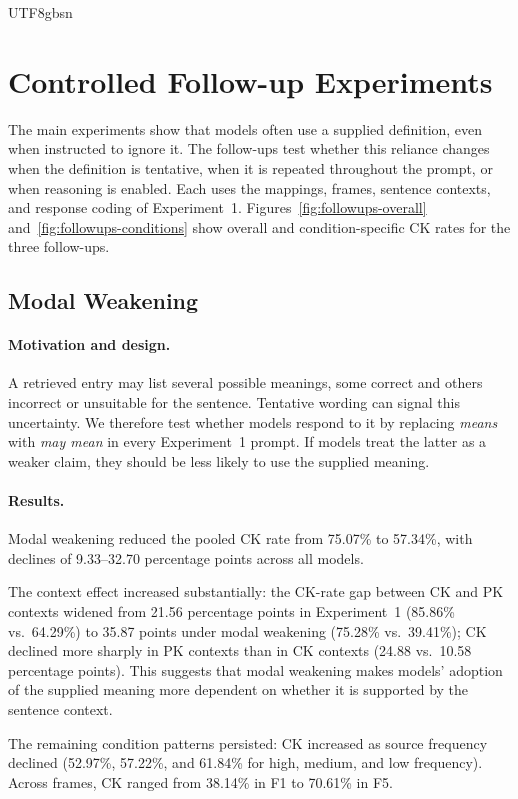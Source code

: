 \documentclass[11pt]{article}
\begin{document}
\begin{CJK*}{UTF8}{gbsn}
\section{Controlled Follow-up Experiments}
\label{sec:followups}

The main experiments show that models often use a supplied definition, even when instructed to ignore it. The follow-ups test whether this reliance changes when the definition is tentative, when it is repeated throughout the prompt, or when reasoning is enabled. Each uses the mappings, frames, sentence contexts, and response coding of Experiment~1. Figures~\ref{fig:followups-overall} and~\ref{fig:followups-conditions} show overall and condition-specific CK rates for the three follow-ups.

\subsection{Modal Weakening}
\label{sec:modal-weakening}

\paragraph{Motivation and design.}
A retrieved entry may list several possible meanings, some correct and others incorrect or unsuitable for the sentence. Tentative wording can signal this uncertainty. We therefore test whether models respond to it by replacing \emph{means} with \emph{may mean} in every Experiment~1 prompt. If models treat the latter as a weaker claim, they should be less likely to use the supplied meaning.

\paragraph{Results.}
Modal weakening reduced the pooled CK rate from 75.07\% to 57.34\%, with declines of 9.33--32.70 percentage points across all models.

The context effect increased substantially: the CK-rate gap between CK and PK contexts widened from 21.56 percentage points in Experiment~1 (85.86\% vs.\ 64.29\%) to 35.87 points under modal weakening (75.28\% vs.\ 39.41\%); CK declined more sharply in PK contexts than in CK contexts (24.88 vs.\ 10.58 percentage points). This suggests that modal weakening makes models' adoption of the supplied meaning more dependent on whether it is supported by the sentence context.

The remaining condition patterns persisted: CK increased as source frequency declined (52.97\%, 57.22\%, and 61.84\% for high, medium, and low frequency). Across frames, CK ranged from 38.14\% in F1 to 70.61\% in F5.


\end{CJK*}
\end{document}

